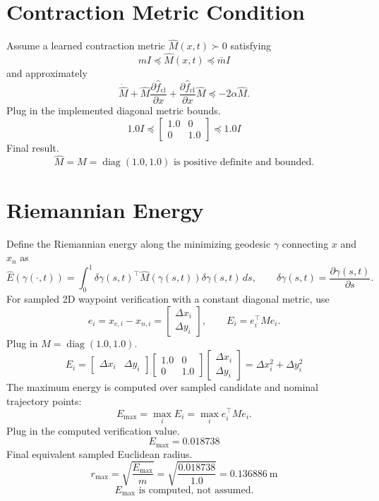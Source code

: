 \documentclass[11pt]{article}
\begin{document}
\section*{Contraction Metric Condition}

Assume a learned contraction metric \(\hat M(x,t)\succ0\) satisfying
\[
mI\preceq \hat M(x,t)\preceq \bar m I
\]
and approximately
\[
\dot{\hat M}
+\hat M\frac{\partial \hat f_{\mathrm{cl}}}{\partial x}
+\frac{\partial \hat f_{\mathrm{cl}}}{\partial x}\hat M
\preceq -2\alpha \hat M .
\]
Plug in the implemented diagonal metric bounds.
\[
1.0I\preceq
\begin{bmatrix}
1.0&0\\
0&1.0
\end{bmatrix}
\preceq 1.0I
\]
Final result.
\[
\boxed{\hat M=M=\operatorname{diag}(1.0,1.0)\text{ is positive definite and bounded.}}
\]

\section*{Riemannian Energy}

Define the Riemannian energy along the minimizing geodesic \(\gamma\) connecting \(x\) and \(x_n\) as
\[
\hat E(\gamma(\cdot,t))
=
\int_0^1
\delta\gamma(s,t)^\top
\hat M(\gamma(s,t))
\delta\gamma(s,t)\,ds,
\qquad
\delta\gamma(s,t)=\frac{\partial\gamma(s,t)}{\partial s}.
\]
For sampled 2D waypoint verification with a constant diagonal metric, use
\[
e_i=x_{c,i}-x_{n,i}
=
\begin{bmatrix}
\Delta x_i\\
\Delta y_i
\end{bmatrix},
\qquad
E_i=e_i^\top M e_i .
\]
Plug in \(M=\operatorname{diag}(1.0,1.0)\).
\[
E_i
=
\begin{bmatrix}
\Delta x_i&\Delta y_i
\end{bmatrix}
\begin{bmatrix}
1.0&0\\
0&1.0
\end{bmatrix}
\begin{bmatrix}
\Delta x_i\\
\Delta y_i
\end{bmatrix}
=\Delta x_i^2+\Delta y_i^2
\]
The maximum energy is computed over sampled candidate and nominal trajectory points:
\[
E_{\max}=\max_i E_i=\max_i e_i^\top M e_i.
\]
Plug in the computed verification value.
\[
E_{\max}=0.018738
\]
Final equivalent sampled Euclidean radius.
\[
r_{\max}
=\sqrt{\frac{E_{\max}}{m}}
=\sqrt{\frac{0.018738}{1.0}}
=0.136886\ \mathrm{m}
\]
\[
\boxed{E_{\max}\text{ is computed, not assumed.}}
\]
\end{document}
